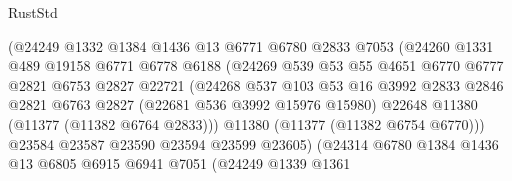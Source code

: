 \begin{lexlean}{RustStd}
\begin{coremodule}
                              (@24249
                                @1332
                                @1384
                                @1436
                                @13
                                @6771
                                @6780
                                @2833
                                @7053
                                (@24260
                                  @1331
                                  @489
                                  @19158
                                  @6771
                                  @6778
                                  @6188
                                  (@24269
                                    @539
                                    @53
                                    @55
                                    @4651
                                    @6770
                                    @6777
                                    @2821
                                    @6753
                                    @2827
                                    @22721
                                    (@24268
                                      @537
                                      @103
                                      @53
                                      @16
                                      @3992
                                      @2833
                                      @2846
                                      @2821
                                      @6763
                                      @2827
                                      (@22681 @536 @3992 @15976 @15980)
                                      @22648
                                      @11380
                                      (@11377 (@11382 @6764 @2833)))
                                    @11380
                                    (@11377 (@11382 @6754 @6770)))
                                  @23584
                                  @23587
                                  @23590
                                  @23594
                                  @23599
                                  @23605)
                                (@24314
                                  @6780
                                  @1384
                                  @1436
                                  @13
                                  @6805
                                  @6915
                                  @6941
                                  @7051
                                  (@24249
                                    @1339
                                    @1361

\end{coremodule}
\end{lexlean}

